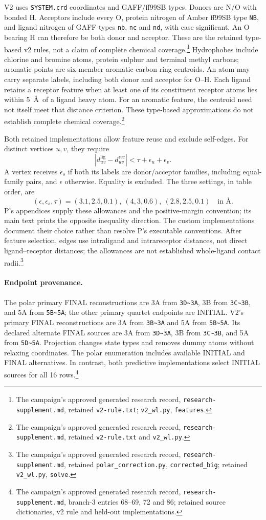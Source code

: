 \documentclass{article}
\newcommand{\rr}[1]{\footnote{The campaign's approved generated research record, \texttt{research-supplement.md}, #1.}}
\begin{document}
V2 uses \texttt{SYSTEM.crd} coordinates and GAFF/ff99SB types. Donors are N/O with bonded H. Acceptors include every O, protein nitrogen of Amber ff99SB type \texttt{NB}, and ligand nitrogen of GAFF types \texttt{nb}, \texttt{nc} and \texttt{nd}, with case significant. An O bearing H can therefore be both donor and acceptor. These are the retained type-based v2 rules, not a claim of complete chemical coverage.\rr{retained \texttt{v2-rule.txt}; \texttt{v2\_wl.py}, \texttt{features}} Hydrophobes include chlorine and bromine atoms, protein sulphur and terminal methyl carbons; aromatic points are six-member aromatic-carbon ring centroids. An atom may carry separate labels, including both donor and acceptor for O--H. Each ligand retains a receptor feature when at least one of its constituent receptor atoms lies within 5~\AA\ of a ligand heavy atom. For an aromatic feature, the centroid need not itself meet that distance criterion. These type-based approximations do not establish complete chemical coverage.\rr{retained \texttt{v2-rule.txt} and \texttt{v2\_wl.py}}

Both retained implementations allow feature reuse and exclude self-edges. For distinct vertices \(u,v\), they require
\[
 |d^{\mathrm{lig}}_{uv}-d^{\mathrm{rec}}_{uv}|
 <\tau+\epsilon_u+\epsilon_v.
\]
A vertex receives \(\epsilon_s\) if both its labels are donor/acceptor families, including equal-family pairs, and \(\epsilon\) otherwise. Equality is excluded. The three settings, in table order, are
\[
 (\epsilon,\epsilon_s,\tau)
 =(3.1,2.5,0.1),\ (4,3,0.6),\ (2.8,2.5,0.1)
 \quad\text{in \AA}.
\]
P's appendices supply these allowances and the positive-margin convention; its main text prints the opposite inequality direction. The custom implementations document their choice rather than resolve P's executable conventions. After feature selection, edges use intraligand and intrareceptor distances, not direct ligand--receptor distances; the allowances are not established whole-ligand contact radii.\cite{P}\rr{retained \texttt{polar\_correction.py}, \texttt{corrected\_big}; retained \texttt{v2\_wl.py}, \texttt{solve}}

\paragraph{Endpoint provenance.}
The polar primary FINAL reconstructions are 3A from \texttt{3D\textasciitilde3A}, 3B from \texttt{3C\textasciitilde3B}, and 5A from \texttt{5B\textasciitilde5A}; the other primary quartet endpoints are INITIAL. V2's primary FINAL reconstructions are 3A from \texttt{3B\textasciitilde3A} and 5A from \texttt{5B\textasciitilde5A}. Its declared alternate FINAL sources are 3A from \texttt{3D\textasciitilde3A}, 3B from \texttt{3C\textasciitilde3B}, and 5A from \texttt{5D\textasciitilde5A}. Projection changes state types and removes dummy atoms without relaxing coordinates. The polar enumeration includes available INITIAL and FINAL alternatives. In contrast, both predictive implementations select INITIAL sources for all 16 rows.\rr{branch-3 entries 68--69, 72 and 86; retained source dictionaries, v2 rule and held-out implementations}
\end{document}
